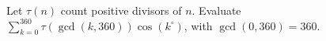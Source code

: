 Let $\tau(n)$ count positive divisors of $n$. Evaluate $\sum_{k=0}^{360}\tau(\gcd(k,360))\cos(k^\circ)$, with $\gcd(0,360)=360$.
